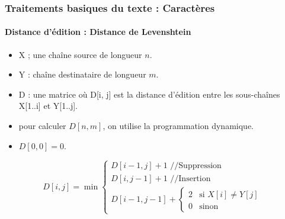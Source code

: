 \documentclass[xcolor=table]{beamer}
\begin{document}
\begin{frame}
\frametitle{Traitements basiques du texte : Caractères}
\framesubtitle{Distance d'édition : Distance de Levenshtein}

\begin{itemize}
	\item X ; une chaîne source de longueur $n$.
	\item Y : chaîne destinataire de longueur $m$.
	\item D : une matrice où D[i, j] est la distance d'édition entre les sous-chaînes X[1..i] et Y[1..j].
	\item pour calculer $D[n, m]$, on utilise la programmation dynamique.
	\item $D[0, 0] = 0$.
\end{itemize}

\[
D[i, j] = \min 
\begin{cases}
D[i - 1, j] + 1 \text{ //Suppression}\\
D[i, j-1] + 1 \text{ //Insertion}\\
D[i-1, j-1] + \begin{cases}
2 & \text{si } X[i] \ne Y[j] \\
0 & \text{sinon}
\end{cases}
\end{cases}
\]

\end{frame}
\end{document}
